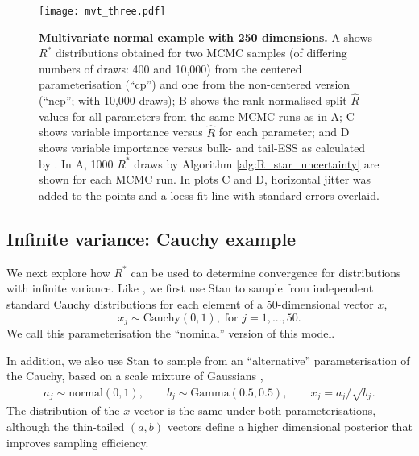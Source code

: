 \documentclass{article}
\begin{document}
\begin{figure}[!htb]
	\centerline{\texttt{[image: mvt\_three.pdf]}}
	\caption{\textbf{Multivariate normal example with 250 dimensions.} A shows $R^*$ distributions obtained for two MCMC samples (of differing numbers of draws: 400 and 10,000) from the centered parameterisation (``cp'') and one from the non-centered version (``ncp''; with 10,000 draws); B shows the rank-normalised split-$\widehat{R}$ values for all parameters from the same MCMC runs as in A; C shows variable importance versus $\widehat{R}$ for each parameter; and D shows variable importance versus bulk- and tail-ESS as calculated by \cite{vehtari2019rank}. In A, 1000 $R^*$ draws by Algorithm \ref{alg:R_star_uncertainty} are shown for each MCMC run. In plots C and D, horizontal jitter was added to the points and a loess fit line with standard errors overlaid.}
	\label{fig:mvt}
\end{figure}

\subsection{Infinite variance: Cauchy example}\label{sec:cauchy}
We next explore how $R^*$ can be used to determine convergence for distributions with infinite variance. Like \cite{vehtari2019rank}, we first use Stan to sample from independent standard Cauchy distributions for each element of a 50-dimensional vector $x$,
%
\begin{equation}
x_j\sim \text{Cauchy}(0, 1),\; \text{for } j=1,...,50.
\end{equation}
%
We call this parameterisation the ``nominal'' version of this model.

In addition, we also use Stan to sample from an ``alternative'' parameterisation of the Cauchy, based on a scale mixture of Gaussians \citep{vehtari2019rank},
%
\begin{align}
a_j \sim  \text{normal}(0,1), \qquad
b_j \sim  \text{Gamma}(0.5, 0.5), \qquad
x_j =  a_j/\sqrt{b_j}.
\end{align}
%
The distribution of the $x$ vector is the same under both parameterisations, although the thin-tailed $(a,b)$ vectors define a higher dimensional posterior that improves sampling efficiency.
\end{document}
